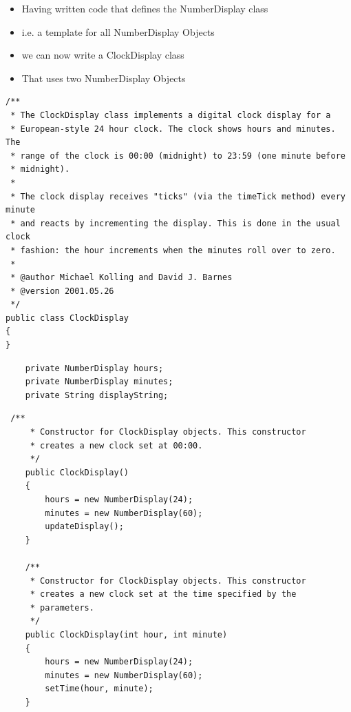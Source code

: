 \documentclass{beamer}
\begin{document}
\begin{frame}

\begin{itemize}
\item Having written code that defines the NumberDisplay class
\item i.e. a template for all NumberDisplay Objects
\item we can now write a ClockDisplay class 
\item That uses two NumberDisplay Objects
\end{itemize}

\end{frame}

\begin{frame}[fragile]

\tiny
\begin{block}{}
\begin{lstlisting}
/**
 * The ClockDisplay class implements a digital clock display for a
 * European-style 24 hour clock. The clock shows hours and minutes. The 
 * range of the clock is 00:00 (midnight) to 23:59 (one minute before 
 * midnight).
 * 
 * The clock display receives "ticks" (via the timeTick method) every minute
 * and reacts by incrementing the display. This is done in the usual clock
 * fashion: the hour increments when the minutes roll over to zero.
 * 
 * @author Michael Kolling and David J. Barnes
 * @version 2001.05.26
 */
public class ClockDisplay
{
}
\end{lstlisting}
\end{block}

\end{frame}

\begin{frame}[fragile]

\begin{block}{}
\begin{lstlisting}
    private NumberDisplay hours;
    private NumberDisplay minutes;
    private String displayString;    
\end{lstlisting}
\end{block}

\end{frame}

\begin{frame}[fragile]
\tiny
\begin{block}{}
\begin{lstlisting}
 /**
     * Constructor for ClockDisplay objects. This constructor 
     * creates a new clock set at 00:00.
     */
    public ClockDisplay()
    {
        hours = new NumberDisplay(24);
        minutes = new NumberDisplay(60);
        updateDisplay();
    }

    /**
     * Constructor for ClockDisplay objects. This constructor
     * creates a new clock set at the time specified by the 
     * parameters.
     */
    public ClockDisplay(int hour, int minute)
    {
        hours = new NumberDisplay(24);
        minutes = new NumberDisplay(60);
        setTime(hour, minute);
    }
\end{lstlisting}
\end{block}

\end{frame}
\end{document}
